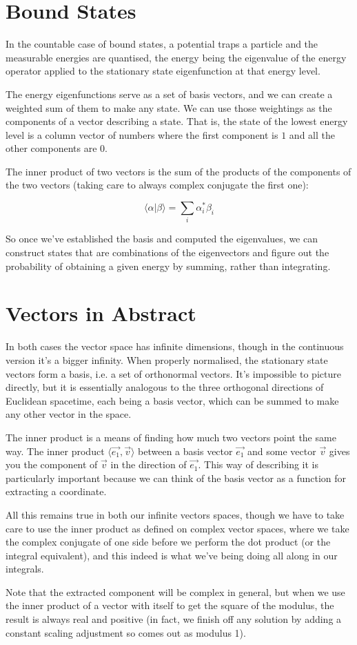 \section{Bound States}

In the countable case of bound states, a potential traps a particle and the measurable energies are quantised, the energy being the eigenvalue of the energy operator applied to the stationary state eigenfunction at that energy level.

The energy eigenfunctions serve as a set of basis vectors, and we can create a weighted sum of them to make any state. We can use those weightings as the components of a vector describing a state. That is, the state of the lowest energy level is a column vector of numbers where the first component is $1$ and all the other components are $0$.

The inner product of two vectors is the sum of the products of the components of the two vectors (taking care to always complex conjugate the first one):

$$
\langle \alpha | \beta \rangle
=
\sum_i
\alpha_i^* \beta_i
$$

So once we've established the basis and computed the eigenvalues, we can construct states that are combinations of the eigenvectors and figure out the probability of obtaining a given energy by summing, rather than integrating.

\section{Vectors in Abstract}

In both cases the vector space has infinite dimensions, though in the continuous version it's a bigger infinity. When properly normalised, the stationary state vectors form a basis, i.e. a set of orthonormal vectors. It's impossible to picture directly, but it is essentially analogous to the three orthogonal directions of Euclidean spacetime, each being a basis vector, which can be summed to make any other vector in the space.

The inner product is a means of finding how much two vectors point the same way. The inner product $\langle \vec{e_1}, \vec{v} \rangle$ between a basis vector $\vec{e_1}$ and some vector $\vec{v}$ gives you the component of $\vec{v}$ in the direction of $\vec{e_1}$. This way of describing it is particularly important because we can think of the basis vector as a function for extracting a coordinate.

All this remains true in both our infinite vectors spaces, though we have to take care to use the inner product as defined on complex vector spaces, where we take the complex conjugate of one side before we perform the dot product (or the integral equivalent), and this indeed is what we've being doing all along in our integrals.

Note that the extracted component will be complex in general, but when we use the inner product of a vector with itself to get the square of the modulus, the result is always real and positive (in fact, we finish off any solution by adding a constant scaling adjustment so comes out as modulus 1).
